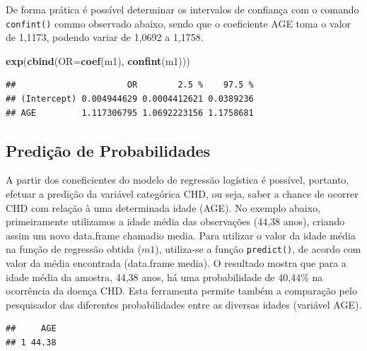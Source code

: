 \documentclass[12pt,brazil,]{book}
\newenvironment{Shaded}{\begin{snugshade}}{\end{snugshade}}
\newcommand{\DataTypeTok}[1]{\textcolor[rgb]{0.13,0.29,0.53}{#1}}
\newcommand{\KeywordTok}[1]{\textcolor[rgb]{0.13,0.29,0.53}{\textbf{#1}}}
\newcommand{\NormalTok}[1]{#1}
\newcommand{\OperatorTok}[1]{\textcolor[rgb]{0.81,0.36,0.00}{\textbf{#1}}}
\newcommand{\StringTok}[1]{\textcolor[rgb]{0.31,0.60,0.02}{#1}}
\begin{document}
De forma prática é possível determinar os intervalos de confiança com o
comando \texttt{confint()} commo observado abaixo, sendo que o
coeficiente AGE toma o valor de 1,1173, podendo variar de 1,0692 a
1,1758.

\begin{Shaded}
\begin{Highlighting}[]
\KeywordTok{exp}\NormalTok{(}\KeywordTok{cbind}\NormalTok{(}\DataTypeTok{OR=}\KeywordTok{coef}\NormalTok{(m1), }\KeywordTok{confint}\NormalTok{(m1)))}
\end{Highlighting}
\end{Shaded}

\begin{verbatim}
##                      OR        2.5 %    97.5 %
## (Intercept) 0.004944629 0.0004412621 0.0389236
## AGE         1.117306795 1.0692223156 1.1758681
\end{verbatim}

\hypertarget{predicao-de-probabilidades}{%
\subsection{Predição de
Probabilidades}\label{predicao-de-probabilidades}}

A partir dos coneficientes do modelo de regressão logística é possível,
portanto, efetuar a predição da variável categórica CHD, ou seja, saber
a chance de ocorrer CHD com relação à uma determinada idade (AGE). No
exemplo abaixo, primeiramente utilizamos a idade média das observações
(44,38 anos), criando assim um novo data.frame chamadio media. Para
utilizar o valor da idade média na função de regressão obtida (\(m1\)),
utiliza-se a função \texttt{predict()}, de acordo com valor da média
encontrada (data.frame media). O resultado mostra que para a idade média
da amostra, 44,38 anos, há uma probabilidade de 40,44\% na ocorrência da
doença CHD. Esta ferramenta permite também a comparação pelo pesquisador
das diferentes probabilidades entre as diversas idades (variável AGE).

\begin{Shaded}
\end{Shaded}

\begin{verbatim}
##     AGE
## 1 44.38
\end{verbatim}
\end{document}
